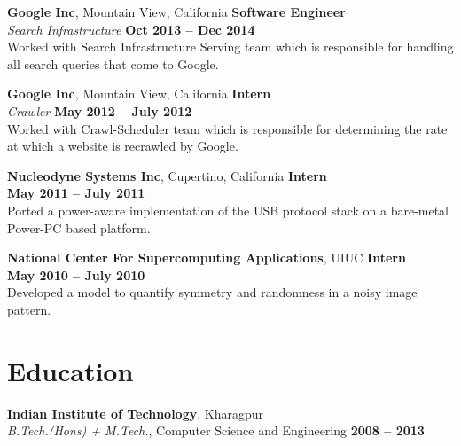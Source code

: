 \documentclass[margin,line]{resume}
\begin{document}
\begin{resume}
    \textbf{Google Inc}, Mountain View, California \hfill \textbf{Software Engineer} \vspace{2mm}\\\vspace{1mm}%
    \textsl{Search Infrastructure} \hfill \textbf{Oct 2013 -- Dec 2014}\vspace{1.5mm}\\\vspace{0mm}%
     Worked with Search Infrastructure Serving team which is responsible for handling all search queries that come to Google. 

    \textbf{Google Inc}, Mountain View, California \hfill \textbf{Intern} \vspace{2mm}\\\vspace{1mm}%
    \textsl{Crawler} \hfill \textbf{May 2012 -- July 2012}\\
    Worked with Crawl-Scheduler team which is responsible for determining the rate at which a website is recrawled by Google.

    \textbf{Nucleodyne Systems Inc}, Cupertino, California \hfill \textbf{Intern} \vspace{2mm}\\\vspace{1mm}%
    \hfill \textbf{May 2011 -- July 2011}\\
    Ported a power-aware implementation of the USB protocol stack on a bare-metal Power-PC based platform.

   \textbf{National Center For Supercomputing Applications}, UIUC \hfill \textbf{Intern} \vspace{2mm}\\\vspace{1mm}%
    \hfill \textbf{May 2010 -- July 2010}\\
    Developed a model to quantify symmetry and randomness in a noisy image pattern.

    \section{\mysidestyle Education}

    \textbf{Indian Institute of Technology}, Kharagpur \vspace{2mm}\\\vspace{1mm}%
    \textsl{B.Tech.(Hons) + M.Tech.}, Computer Science and Engineering \hfill \textbf{ 2008 -- 2013}\vspace{-3mm}\\\vspace{-1mm}%


\end{resume}
\end{document}
